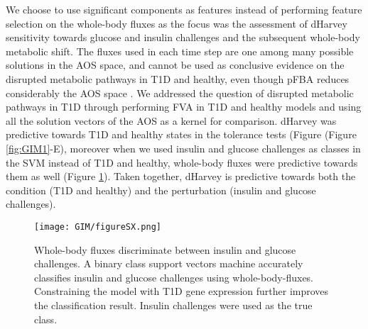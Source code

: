 We choose to use significant components as features instead of performing feature selection on the whole-body fluxes as the focus was the assessment of dHarvey sensitivity towards glucose and insulin challenges and the subsequent whole-body metabolic shift. The fluxes used in each time step are one among many possible solutions in the AOS space, and cannot be used as conclusive evidence on the disrupted metabolic pathways in T1D and healthy, even though pFBA reduces considerably the AOS space \cite{toroghi2016multi}. We addressed the question of disrupted  metabolic pathways in T1D through performing FVA in T1D and healthy models and using all the solution vectors of the AOS as a kernel for comparison. dHarvey was predictive towards T1D and healthy states in the tolerance tests (Figure (Figure \ref{fig:GIM1}-E), moreover when we used insulin and glucose challenges as classes in the SVM instead of T1D and healthy, whole-body fluxes were predictive towards them as well (Figure \ref{fig:s1GIM}). Taken together, dHarvey is predictive towards both the condition (T1D and healthy) and the perturbation (insulin and glucose challenges).
\begin{figure}[!htp]
\centering
	\texttt{[image: GIM/figureSX.png]}%
	\caption[Whole-body fluxes discriminate between insulin and glucose challenges.]{Whole-body fluxes discriminate between insulin and glucose challenges. A binary class support vectors machine accurately classifies insulin and glucose challenges using whole-body-fluxes. Constraining the model with T1D gene expression further improves the classification result. Insulin challenges were used as the true class.}
	\label{fig:s1GIM}
\end{figure}
